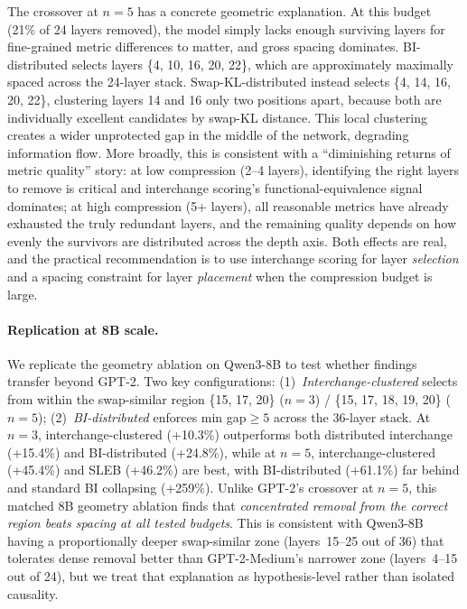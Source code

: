 \documentclass{article}
\begin{document}
The crossover at $n{=}5$ has a concrete geometric explanation. At this budget (21\% of 24 layers removed), the model simply lacks enough surviving layers for fine-grained metric differences to matter, and gross spacing dominates. BI-distributed selects layers \{4, 10, 16, 20, 22\}, which are approximately maximally spaced across the 24-layer stack. Swap-KL-distributed instead selects \{4, 14, 16, 20, 22\}, clustering layers 14 and 16 only two positions apart, because both are individually excellent candidates by swap-KL distance. This local clustering creates a wider unprotected gap in the middle of the network, degrading information flow. More broadly, this is consistent with a ``diminishing returns of metric quality'' story: at low compression (2--4 layers), identifying the right layers to remove is critical and interchange scoring's functional-equivalence signal dominates; at high compression (5+ layers), all reasonable metrics have already exhausted the truly redundant layers, and the remaining quality depends on how evenly the survivors are distributed across the depth axis. Both effects are real, and the practical recommendation is to use interchange scoring for layer \emph{selection} and a spacing constraint for layer \emph{placement} when the compression budget is large.

\paragraph{Replication at 8B scale.}
We replicate the geometry ablation on Qwen3-8B to test whether findings transfer beyond GPT-2. Two key configurations: (1)~\emph{Interchange-clustered} selects from within the swap-similar region \{15, 17, 20\} ($n{=}3$) / \{15, 17, 18, 19, 20\} ($n{=}5$); (2)~\emph{BI-distributed} enforces min gap${\geq}5$ across the 36-layer stack. At $n{=}3$, interchange-clustered (+10.3\%) outperforms both distributed interchange (+15.4\%) and BI-distributed (+24.8\%), while at $n{=}5$, interchange-clustered (+45.4\%) and SLEB (+46.2\%) are best, with BI-distributed (+61.1\%) far behind and standard BI collapsing (+259\%). Unlike GPT-2's crossover at $n{=}5$, this matched 8B geometry ablation finds that \emph{concentrated removal from the correct region beats spacing at all tested budgets}. This is consistent with Qwen3-8B having a proportionally deeper swap-similar zone (layers~15--25 out of 36) that tolerates dense removal better than GPT-2-Medium's narrower zone (layers~4--15 out of 24), but we treat that explanation as hypothesis-level rather than isolated causality.
\end{document}
